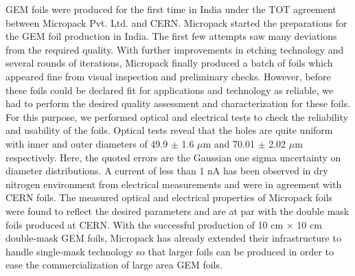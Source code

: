 GEM foils were produced for the first time in India under the TOT agreement between Micropack Pvt. Ltd. and CERN. Micropack started the preparations for the GEM foil production in India. The first few attempts saw many deviations from the required quality. With further improvements in etching technology and several rounds of iterations, Micropack finally produced a batch of foils which appeared fine from visual inspection and preliminary checks. However, before these foils could be declared fit for applications and technology as reliable, we had to perform the desired quality assessment and characterization for these foils. For this purpose, we performed optical and electrical tests to check the reliability and usability of the foils. Optical tests reveal that the holes are quite uniform with inner and outer diameters of 49.9 $\pm$ 1.6 $\mu$m and 70.01 $\pm$ 2.02 $\mu$m respectively. Here, the quoted errors are the Gaussian one sigma uncertainty on diameter distributions. A current of less than 1 nA has been observed in dry nitrogen environment from electrical measurements and were in agreement with CERN foils. The measured optical and electrical properties of Micropack foils were found to reflect the desired parameters and are at par with the double mask foils produced at CERN. With the successful production of 10 cm $\times$ 10 cm double-mask GEM foils, Micropack has already extended their infrastructure to handle single-mask technology so that larger foils can be produced in order to ease the commercialization of large area GEM foils.

